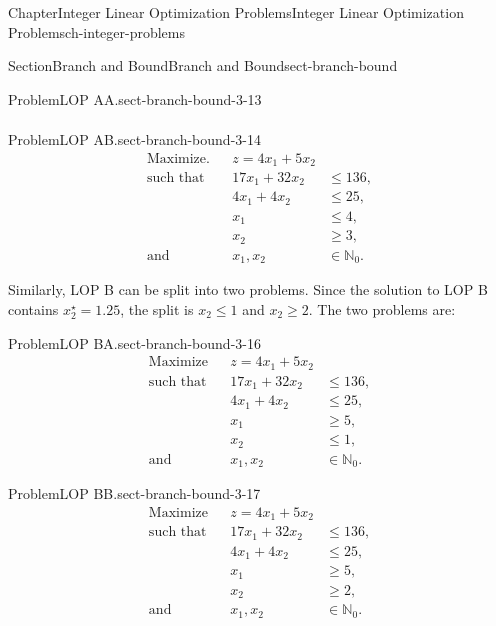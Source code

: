 \documentclass[oneside,10pt,]{book}
\numberwithin{equation}{section}
\newcommand{\amp}{&}
\begin{document}
\begin{chapterptx}{Chapter}{Integer Linear Optimization Problems}{}{Integer Linear Optimization Problems}{}{}{ch-integer-problems}
\begin{sectionptx}{Section}{Branch and Bound}{}{Branch and Bound}{}{}{sect-branch-bound}
\begin{introduction}{}
\begin{problem}{Problem}{LOP AA.}{sect-branch-bound-3-13}
\begin{equation*}
\begin{aligned}
\end{aligned}
\end{equation*}
%
\end{problem}
\begin{problem}{Problem}{LOP AB.}{sect-branch-bound-3-14}%
%
\begin{equation*}
\begin{aligned} \text{Maximize.} \amp\amp z = 4x_1 + 5x_2 \amp \\ \text{such that}\amp\amp 17x_1+32x_2 \amp\leq 136, \\ \amp\amp 4x_1 + 4x_2 \amp\leq 25, \\ \amp\amp x_1 \amp \leq 4, \\ \amp\amp x_2 \amp \geq 3, \\ \text{and}\amp\amp x_1, x_2 \amp \in \mathbb{N}_0.
\end{aligned}
\end{equation*}
%
\end{problem}
Similarly, LOP B can be split into two problems. Since the solution to LOP B contains \(x_{2}^{\star}=1.25\), the split is \(x_{2} \leq 1\) and \(x_{2} \geq 2\). The two problems are:%
\begin{problem}{Problem}{LOP BA.}{sect-branch-bound-3-16}%
%
\begin{equation*}
\begin{aligned} \text{Maximize} \amp\amp z = 4x_1 + 5x_2 \amp \\ \text{such that}\amp\amp 17x_1+32x_2 \amp\leq 136, \\ \amp\amp 4x_1 + 4x_2   \amp\leq 25, \\ \amp\amp x_1 \amp \geq 5, \\ \amp\amp x_2 \amp \leq 1, \\ \text{and}\amp\amp x_1, x_2 \amp \in \mathbb{N}_0.
\end{aligned}
\end{equation*}
%
\end{problem}
\begin{problem}{Problem}{LOP BB.}{sect-branch-bound-3-17}%
%
\begin{equation*}
\begin{aligned} \text{Maximize} \amp\amp z = 4x_1 + 5x_2 \amp \\ \text{such that}\amp\amp 17x_1+32x_2 \amp\leq 136, \\ \amp\amp 4x_1 + 4x_2   \amp\leq 25, \\ \amp\amp x_1 \amp \geq 5, \\ \amp\amp x_2 \amp \geq 2, \\ \text{and}\amp\amp x_1, x_2 \amp \in \mathbb{N}_0.

\end{aligned}
\end{equation*}
\end{problem}
\end{introduction}
\end{sectionptx}
\end{chapterptx}
\end{document}
